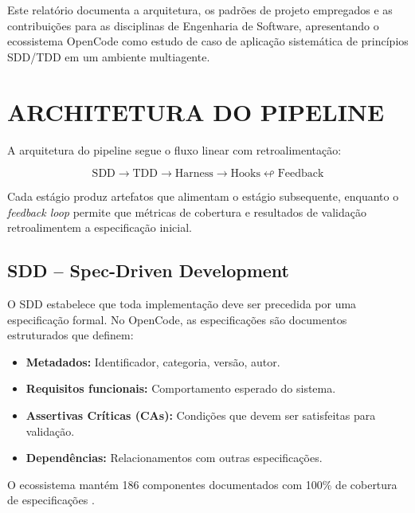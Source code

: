 \documentclass[
  brazil,
  sumario=tradicional,
  10pt
]{abntex2}
\begin{document}
Este relatório documenta a arquitetura, os padrões de projeto empregados
e as contribuições para as disciplinas de Engenharia de Software,
apresentando o ecossistema OpenCode como estudo de caso de aplicação
sistemática de princípios SDD/TDD em um ambiente multiagente.

\section{ARCHITETURA DO PIPELINE}

A arquitetura do pipeline segue o fluxo linear com retroalimentação:

\begin{equation}
  \text{SDD} \longrightarrow \text{TDD} \longrightarrow
  \text{Harness} \longrightarrow \text{Hooks}
  \looparrowleft \text{Feedback}
\end{equation}

Cada estágio produz artefatos que alimentam o estágio subsequente,
enquanto o \textit{feedback loop} permite que métricas de cobertura e
resultados de validação retroalimentem a especificação inicial.

\subsection{SDD -- Spec-Driven Development}

O SDD estabelece que toda implementação deve ser precedida por uma
especificação formal. No OpenCode, as especificações são documentos
estruturados que definem:

\begin{itemize}
  \item \textbf{Metadados:} Identificador, categoria, versão, autor.
  \item \textbf{Requisitos funcionais:} Comportamento esperado do sistema.
  \item \textbf{Assertivas Críticas (CAs):} Condições que devem ser
    satisfeitas para validação.
  \item \textbf{Dependências:} Relacionamentos com outras especificações.
\end{itemize}

O ecossistema mantém 186 componentes documentados com 100\% de cobertura
de especificações \cite{OpenCode2025}.
\end{document}
